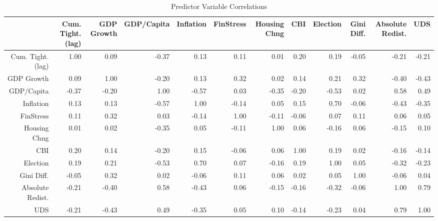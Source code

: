 \begin{table}[ht]
\centering
\caption{Predictor Variable Correlations} 
\begingroup\tiny
\begin{tabular}{rrrrrrrrrrrr}
  \hline
 & Cum. Tight. (lag) & GDP Growth & GDP/Capita & Inflation & FinStress & Housing Chng & CBI & Election & Gini Diff. & Absolute Redist. & UDS \\ 
  \hline
Cum. Tight. (lag) & 1.00 & 0.09 & -0.37 & 0.13 & 0.11 & 0.01 & 0.20 & 0.19 & -0.05 & -0.21 & -0.21 \\ 
  GDP Growth & 0.09 & 1.00 & -0.20 & 0.13 & 0.32 & 0.02 & 0.14 & 0.21 & 0.32 & -0.40 & -0.43 \\ 
  GDP/Capita & -0.37 & -0.20 & 1.00 & -0.57 & 0.03 & -0.35 & -0.20 & -0.53 & 0.02 & 0.58 & 0.49 \\ 
  Inflation & 0.13 & 0.13 & -0.57 & 1.00 & -0.14 & 0.05 & 0.15 & 0.70 & -0.06 & -0.43 & -0.35 \\ 
  FinStress & 0.11 & 0.32 & 0.03 & -0.14 & 1.00 & -0.11 & -0.06 & 0.07 & 0.11 & 0.06 & 0.05 \\ 
  Housing Chng & 0.01 & 0.02 & -0.35 & 0.05 & -0.11 & 1.00 & 0.06 & -0.16 & 0.06 & -0.15 & 0.10 \\ 
  CBI & 0.20 & 0.14 & -0.20 & 0.15 & -0.06 & 0.06 & 1.00 & 0.19 & 0.02 & -0.16 & -0.14 \\ 
  Election & 0.19 & 0.21 & -0.53 & 0.70 & 0.07 & -0.16 & 0.19 & 1.00 & 0.05 & -0.32 & -0.23 \\ 
  Gini Diff. & -0.05 & 0.32 & 0.02 & -0.06 & 0.11 & 0.06 & 0.02 & 0.05 & 1.00 & -0.06 & 0.04 \\ 
  Absolute Redist. & -0.21 & -0.40 & 0.58 & -0.43 & 0.06 & -0.15 & -0.16 & -0.32 & -0.06 & 1.00 & 0.79 \\ 
  UDS & -0.21 & -0.43 & 0.49 & -0.35 & 0.05 & 0.10 & -0.14 & -0.23 & 0.04 & 0.79 & 1.00 \\ 
   \hline
\end{tabular}
\endgroup
\end{table}
